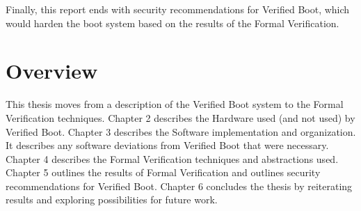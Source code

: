 Finally, this report ends with security recommendations for Verified Boot, which
would harden the boot system based on the results of the Formal Verification.

\section{Overview}

This thesis moves from a description of the Verified Boot system to the Formal
Verification techniques.
Chapter 2 describes the Hardware used (and not used) by Verified Boot.
Chapter 3 describes the Software implementation and organization.
It describes any software deviations from Verified Boot that were
necessary.
Chapter 4 describes the Formal Verification techniques and abstractions used.
Chapter 5 outlines the results of Formal Verification and outlines security
recommendations for Verified Boot.
Chapter 6 concludes the thesis by reiterating results and exploring
possibilities for future work.
